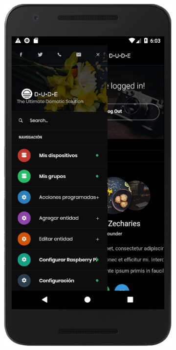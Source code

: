 \begin{figure}[H]
  \centering

  \begin{subfigure}[b]{0.2\textwidth}
    \includegraphics[width=\textwidth, keepaspectratio]{images/app-movil-sidebar}

\end{subfigure}
\end{figure}
